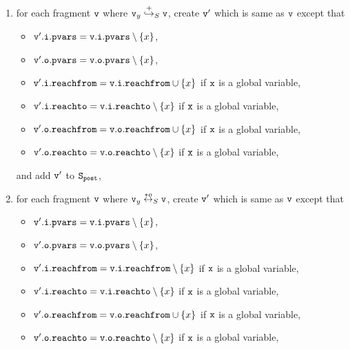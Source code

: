 \begin{description}
\begin{enumerate}
\item for each fragment $\mathtt{v}$ where $\mathtt{v}_y \overset{+}\hookrightarrow_S \mathtt{v}$, create $\mathtt{v}'$ which is same as $\mathtt{v}$ except that
\begin{itemize}
\item $\mathtt{v}'.\mathtt{i}.\mathtt{pvars} = \mathtt{v}.\mathtt{i}.\mathtt{pvars} \setminus \left\{x\right\}$,
\item $\mathtt{v}'.\mathtt{o}.\mathtt{pvars} = \mathtt{v}.\mathtt{o}.\mathtt{pvars} \setminus \left\{x\right\}$,
\item $\mathtt{v}'.\mathtt{i}.\mathtt{reachfrom} = \mathtt{v}.\mathtt{i}.\mathtt{reachfrom} \cup \left\{x\right\}$ if $\tt x$ is a global variable,
\item $\mathtt{v}'.\mathtt{i}.\mathtt{reachto} = \mathtt{v}.\mathtt{i}.\mathtt{reachto} \setminus \left\{x\right\}$ if $\tt x$ is a global variable,
 \item $\mathtt{v}'.\mathtt{o}.\mathtt{reachfrom} = \mathtt{v}.\mathtt{o}.\mathtt{reachfrom} \cup \left\{x\right\}$ if $\tt x$ is a global variable,
 \item $\mathtt{v}'.\mathtt{o}.\mathtt{reachto} = \mathtt{v}.\mathtt{o}.\mathtt{reachto} \setminus \left\{x\right\}$ if $\tt x$ is a global variable,

\end{itemize}
and add $\mathtt{v}'$ to $\tt S_{post}$,
\item for each fragment $\mathtt{v}$ where $\mathtt{v}_y \overset{*o}\leftrightarrow_S \mathtt{v}$, create $\mathtt{v}'$ which is same as $\mathtt{v}$ except that
\begin{itemize}
\item $\mathtt{v}'.\mathtt{i}.\mathtt{pvars} = \mathtt{v}.\mathtt{i}.\mathtt{pvars} \setminus \left\{x\right\}$,
\item $\mathtt{v}'.\mathtt{o}.\mathtt{pvars} = \mathtt{v}.\mathtt{o}.\mathtt{pvars} \setminus \left\{x\right\}$,
\item $\mathtt{v}'.\mathtt{i}.\mathtt{reachfrom} = \mathtt{v}.\mathtt{i}.\mathtt{reachfrom} \setminus \left\{x\right\}$ if $\tt x$ is a global variable,
\item $\mathtt{v}'.\mathtt{i}.\mathtt{reachto} = \mathtt{v}.\mathtt{i}.\mathtt{reachto} \setminus \left\{x\right\}$ if $\tt x$ is a global variable,
\item $\mathtt{v}'.\mathtt{o}.\mathtt{reachfrom} = \mathtt{v}.\mathtt{o}.\mathtt{reachfrom} \cup \left\{x\right\}$ if $\tt x$ is a global variable,
\item $\mathtt{v}'.\mathtt{o}.\mathtt{reachto} = \mathtt{v}.\mathtt{o}.\mathtt{reachto} \setminus \left\{x\right\}$ if $\tt x$ is a global variable,


\end{itemize}
\end{enumerate}
\end{description}
